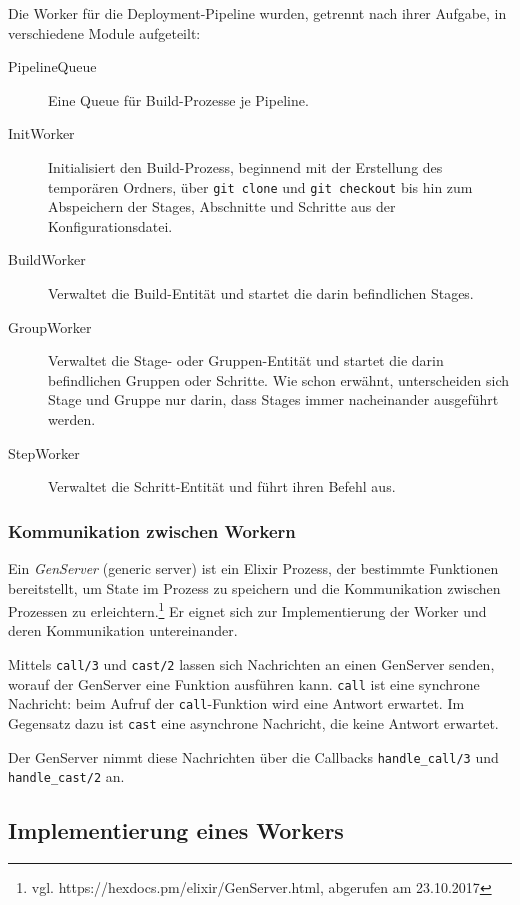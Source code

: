 Die Worker für die Deployment-Pipeline wurden, getrennt nach ihrer Aufgabe, in verschiedene Module aufgeteilt:

\begin{description}
  \item [PipelineQueue] Eine Queue für Build-Prozesse je Pipeline.
  \item [InitWorker] Initialisiert den Build-Prozess, beginnend mit der Erstellung des temporären Ordners, über \texttt{git clone} und \texttt{git checkout} bis hin zum Abspeichern der Stages, Abschnitte und Schritte aus der Konfigurationsdatei.
  \item [BuildWorker] Verwaltet die Build-Entität und startet die darin befindlichen Stages.
  \item [GroupWorker] Verwaltet die Stage- oder Gruppen-Entität und startet die darin befindlichen Gruppen oder Schritte. Wie schon erwähnt, unterscheiden sich Stage und Gruppe nur darin, dass Stages immer nacheinander ausgeführt werden.
  \item [StepWorker] Verwaltet die Schritt-Entität und führt ihren Befehl aus.
\end{description}

\subsubsection{Kommunikation zwischen Workern}

Ein \emph{GenServer} (generic server) ist ein Elixir Prozess, der bestimmte Funktionen bereitstellt, um State im Prozess zu speichern und die Kommunikation zwischen Prozessen zu erleichtern.\footnote{vgl. https://hexdocs.pm/elixir/GenServer.html, abgerufen am 23.10.2017} Er eignet sich zur Implementierung der Worker und deren Kommunikation untereinander.

Mittels \texttt{call/3} und \texttt{cast/2} lassen sich Nachrichten an einen GenServer senden, worauf der GenServer eine Funktion ausführen kann. \texttt{call} ist eine synchrone Nachricht: beim Aufruf der \texttt{call}-Funktion wird eine Antwort erwartet. Im Gegensatz dazu ist \texttt{cast} eine asynchrone Nachricht, die keine Antwort erwartet.

Der GenServer nimmt diese Nachrichten über die Callbacks \texttt{handle\_\allowbreak call/3} und \texttt{handle\_\allowbreak cast/2} an.

\subsection{Implementierung eines Workers}
\label{subsec:implementierung-worker}

